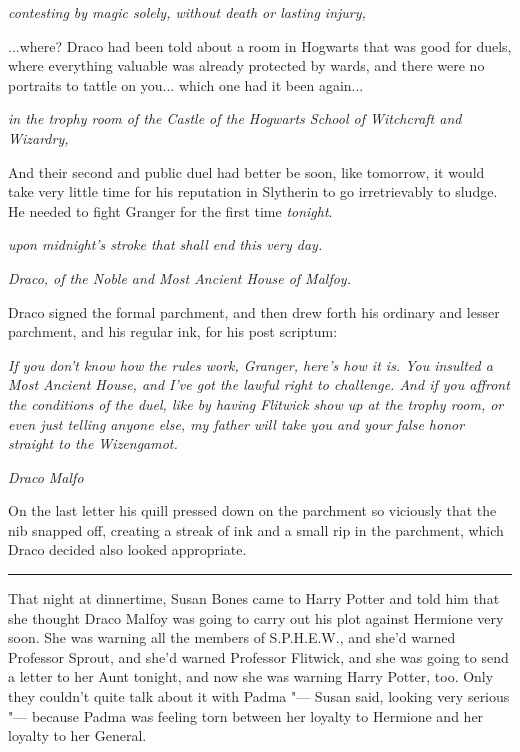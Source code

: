 \emph{contesting by magic solely, without death or lasting injury,}

...where? Draco had been told about a room in Hogwarts that was
good for duels, where everything valuable was already protected by
wards, and there were no portraits to tattle on you... which one
had it been again...

\emph{in the trophy room of the Castle of the Hogwarts School of
Witchcraft and Wizardry,}

And their second and public duel had better be soon, like tomorrow, it
would take very little time for his reputation in Slytherin to go
irretrievably to sludge. He needed to fight Granger for the first time
\emph{tonight}.

\emph{upon midnight's stroke that shall end this very day.}

\emph{Draco, of the Noble and Most Ancient House of Malfoy.}

Draco signed the formal parchment, and then drew forth his ordinary and
lesser parchment, and his regular ink, for his post scriptum:

\emph{If you don't know how the rules work, Granger, here's how it is.
You insulted a Most Ancient House, and I've got the lawful right to
challenge. And if you affront the conditions of the duel, like by having
Flitwick show up at the trophy room, or even just telling anyone else,
my father will take you and your false honor straight to the
Wizengamot.}

\emph{Draco Malfo}

On the last letter his quill pressed down on the parchment so viciously
that the nib snapped off, creating a streak of ink and a small rip in
the parchment, which Draco decided also looked appropriate.

\begin{center}\rule{3in}{0.4pt}\end{center}

That night at dinnertime, Susan Bones came to Harry Potter and told him
that she thought Draco Malfoy was going to carry out his plot against
Hermione very soon. She was warning all the members of S.P.H.E.W., and
she'd warned Professor Sprout, and she'd warned Professor Flitwick, and
she was going to send a letter to her Aunt tonight, and now she was
warning Harry Potter, too. Only they couldn't quite talk about it with
Padma "--- Susan said, looking very serious "--- because Padma was feeling
torn between her loyalty to Hermione and her loyalty to her General.

